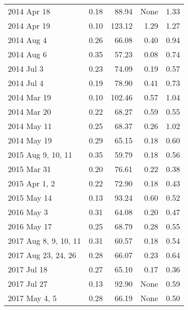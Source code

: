 \begin{tabular}{lrrrr}
           2014 Apr 18 &    0.18 &   88.94 &  None &  1.33 \\
           2014 Apr 19 &    0.10 &  123.12 &  1.29 &  1.27 \\
            2014 Aug 4 &    0.26 &   66.08 &  0.40 &  0.94 \\
            2014 Aug 6 &    0.35 &   57.23 &  0.08 &  0.74 \\
            2014 Jul 3 &    0.23 &   74.09 &  0.19 &  0.57 \\
            2014 Jul 4 &    0.19 &   78.90 &  0.41 &  0.73 \\
           2014 Mar 19 &    0.10 &  102.46 &  0.57 &  1.04 \\
           2014 Mar 20 &    0.22 &   68.27 &  0.59 &  0.55 \\
           2014 May 11 &    0.25 &   68.37 &  0.26 &  1.02 \\
           2014 May 19 &    0.29 &   65.15 &  0.18 &  0.60 \\
    2015 Aug 9, 10, 11 &    0.35 &   59.79 &  0.18 &  0.56 \\
           2015 Mar 31 &    0.20 &   76.61 &  0.22 &  0.38 \\
         2015 Apr 1, 2 &    0.22 &   72.90 &  0.18 &  0.43 \\
           2015 May 14 &    0.13 &   93.24 &  0.60 &  0.52 \\
            2016 May 3 &    0.31 &   64.08 &  0.20 &  0.47 \\
           2016 May 17 &    0.25 &   68.79 &  0.28 &  0.55 \\
 2017 Aug 8, 9, 10, 11 &    0.31 &   60.57 &  0.18 &  0.54 \\
   2017 Aug 23, 24, 26 &    0.28 &   66.07 &  0.23 &  0.64 \\
           2017 Jul 18 &    0.27 &   65.10 &  0.17 &  0.36 \\
           2017 Jul 27 &    0.13 &   92.90 &  None &  0.59 \\
         2017 May 4, 5 &    0.28 &   66.19 &  None &  0.50 \\
\bottomrule
\end{tabular}
